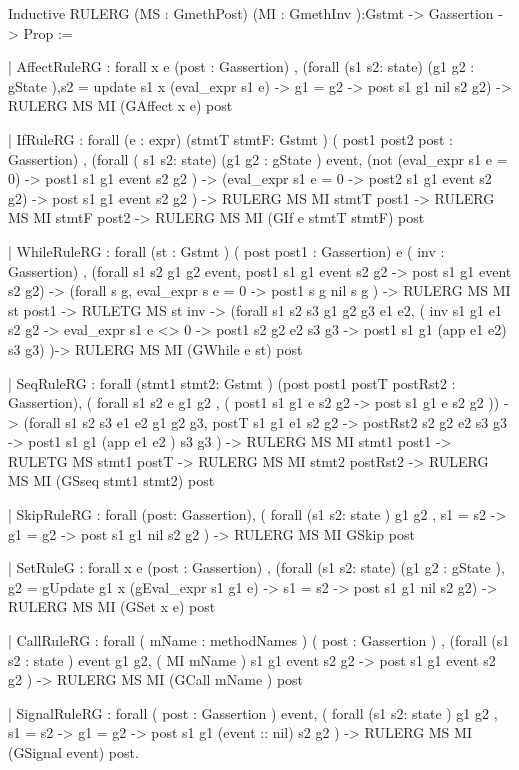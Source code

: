 \documentclass{article}
\begin{document}
\begin{coq_example}

Inductive RULERG (MS : GmethPost) (MI : GmethInv ):Gstmt -> Gassertion -> Prop :=
 
 | AffectRuleRG : forall   x e (post : Gassertion) , 
   (forall  (s1 s2: state) (g1 g2 : gState ),s2 = update s1 x (eval_expr s1 e) -> 
   g1 = g2 ->
   post s1 g1  nil s2 g2)  ->
   RULERG MS  MI (GAffect x e) post
 
 | IfRuleRG : forall   (e : expr) (stmtT stmtF: Gstmt ) ( post1  post2 post : Gassertion) , 
   (forall ( s1 s2: state) (g1 g2 : gState ) event,  
      (not (eval_expr s1 e = 0) -> post1 s1  g1 event s2 g2 ) -> 
      (eval_expr s1 e = 0 ->  post2 s1 g1 event s2 g2)  -> 
   post s1 g1 event s2 g2 ) ->
   RULERG MS MI stmtT   post1   ->
   RULERG MS MI stmtF   post2   ->
   RULERG MS MI (GIf e stmtT stmtF) post 

 | WhileRuleRG : forall   (st : Gstmt ) ( post post1   : Gassertion) e ( inv : Gassertion)   ,
   (forall s1 s2 g1 g2 event, post1 s1 g1 event s2 g2   ->  post s1 g1  event s2 g2) ->
   (forall s g, eval_expr s e = 0  -> post1 s g nil s g   ) ->  
   RULERG MS MI st post1     -> 
   RULETG MS st  inv  ->
   (forall  s1 s2 s3 g1 g2 g3 e1 e2,  ( inv s1 g1 e1 s2 g2  -> eval_expr s1 e <>  0 -> post1 s2 g2  e2 s3 g3 -> post1 s1 g1 (app e1 e2) s3 g3) )->
   RULERG MS  MI  (GWhile e st) post  


 |  SeqRuleRG : forall  (stmt1 stmt2: Gstmt ) (post  post1 postT  postRst2 : Gassertion), 
  ( forall s1 s2  e g1 g2 , ( post1 s1 g1 e s2 g2 -> post s1 g1  e s2 g2 )) -> 
   (forall s1 s2 s3 e1 e2 g1 g2 g3,  postT s1 g1 e1 s2 g2 -> postRst2 s2 g2 e2 s3 g3 ->  post1 s1 g1 (app e1 e2 ) s3 g3 ) -> 
   RULERG MS MI stmt1  post1 ->
   RULETG  MS stmt1   postT -> 
   RULERG MS MI stmt2 postRst2   ->
   RULERG MS MI (GSseq stmt1 stmt2) post

 | SkipRuleRG :   forall  (post: Gassertion),
   ( forall (s1 s2: state ) g1 g2  ,  s1 = s2 -> g1 = g2 -> post s1 g1 nil s2 g2 ) ->
   RULERG MS MI GSkip  post

 | SetRuleG :  forall   x e (post : Gassertion) , 
     (forall  (s1 s2: state) (g1 g2 : gState ),   g2 = gUpdate g1 x (gEval_expr  s1 g1 e) -> s1 = s2  -> post s1 g1  nil s2 g2)  ->
     RULERG MS  MI (GSet x e) post


 | CallRuleRG : forall   ( mName : methodNames ) ( post   : Gassertion ) , 
   (forall (s1 s2 : state ) event g1 g2,  ( MI mName ) s1 g1 event s2 g2  -> post s1 g1  event s2 g2 ) ->
   RULERG MS  MI (GCall mName )  post

 | SignalRuleRG : forall   ( post   : Gassertion ) event, 
    ( forall (s1 s2: state ) g1 g2 ,  s1 = s2 -> g1 = g2 -> post s1 g1 (event :: nil) s2 g2 ) ->   
    RULERG MS MI (GSignal event)  post. 
\end{coq_example}
\end{document}
